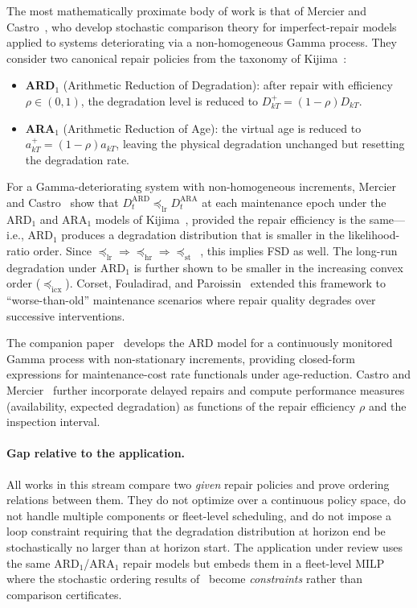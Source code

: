 \documentclass[11pt,a4paper]{article}
\theoremstyle{plain}
\theoremstyle{definition}
\theoremstyle{remark}
\begin{document}
The most mathematically proximate body of work is that of Mercier and Castro~\cite{mercier2019,mercier2013,castro2016}, who develop stochastic comparison theory for imperfect-repair models applied to systems deteriorating via a non-homogeneous Gamma process. They consider two canonical repair policies from the taxonomy of Kijima~\cite{kijima1989}:
\begin{itemize}[nosep]
  \item \textbf{ARD$_1$} (Arithmetic Reduction of Degradation): after repair with efficiency $\rho\in(0,1)$, the degradation level is reduced to $D_{kT}^{+}=(1-\rho)D_{kT}$.
  \item \textbf{ARA$_1$} (Arithmetic Reduction of Age): the virtual age is reduced to $a_{kT}^{+}=(1-\rho)a_{kT}$, leaving the physical degradation unchanged but resetting the degradation rate.
\end{itemize}
For a Gamma-deteriorating system with non-homogeneous increments, Mercier and Castro~\cite{mercier2019} show that $D_t^{\mathrm{ARD}}\preceq_{\mathrm{lr}} D_t^{\mathrm{ARA}}$ at each maintenance epoch under the ARD$_1$ and ARA$_1$ models of Kijima~\cite{kijima1989}, provided the repair efficiency is the same---i.e., ARD$_1$ produces a degradation distribution that is smaller in the likelihood-ratio order. Since $\preceq_{\mathrm{lr}}\Rightarrow\preceq_{\mathrm{hr}}\Rightarrow\preceq_{\mathrm{st}}$~\cite{shaked2007}, this implies FSD as well. The long-run degradation under ARD$_1$ is further shown to be smaller in the increasing convex order ($\preceq_{\mathrm{icx}}$). Corset, Fouladirad, and Paroissin~\cite{corset2024} extended this framework to ``worse-than-old'' maintenance scenarios where repair quality degrades over successive interventions.

The companion paper~\cite{mercier2013} develops the ARD model for a continuously monitored Gamma process with non-stationary increments, providing closed-form expressions for maintenance-cost rate functionals under age-reduction. Castro and Mercier~\cite{castro2016} further incorporate delayed repairs and compute performance measures (availability, expected degradation) as functions of the repair efficiency $\rho$ and the inspection interval.

\paragraph{Gap relative to the application.}
All works in this stream compare two \emph{given} repair policies and prove ordering relations between them. They do not optimize over a continuous policy space, do not handle multiple components or fleet-level scheduling, and do not impose a loop constraint requiring that the degradation distribution at horizon end be stochastically no larger than at horizon start. The application under review uses the same ARD$_1$/ARA$_1$ repair models but embeds them in a fleet-level MILP where the stochastic ordering results of~\cite{mercier2019} become \emph{constraints} rather than comparison certificates.
\end{document}

